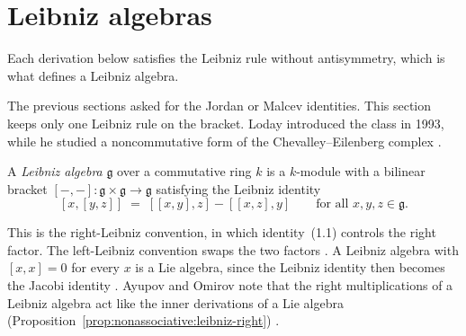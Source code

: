 \section{Leibniz algebras}\label{sec:nonassociative:leibniz}

Each derivation below satisfies the Leibniz rule without antisymmetry, which is what defines a Leibniz algebra.

The previous sections asked for the Jordan or Malcev identities. %
This section keeps only one Leibniz rule on the bracket. Loday introduced
the class in 1993, while he studied a noncommutative form of the
Chevalley--Eilenberg complex \cite[Introduction, p.~139]{LodayPirashvili1993}.

\begin{definition}
\label{def:nonassociative:leibniz}
A \emph{Leibniz algebra} $\mathfrak{g}$ over a commutative ring $k$ is a
$k$-module with a bilinear bracket $[-,-]\colon\mathfrak{g}\times
\mathfrak{g}\to\mathfrak{g}$ satisfying the Leibniz identity
\[
[x,[y,z]]\;=\;[[x,y],z]-[[x,z],y]
\qquad\text{for all }x,y,z\in\mathfrak{g}.
\]
\end{definition}

This is the right-Leibniz convention, in which identity~(1.1) controls the
right factor. The left-Leibniz convention swaps the two factors
\cite[Definition~(1.1), p.~141]{LodayPirashvili1993}. A Leibniz algebra with
$[x,x]=0$ for every $x$ is a Lie algebra, since the Leibniz identity then
becomes the Jacobi identity \cite[Definition~(1.1),
p.~141]{LodayPirashvili1993}. Ayupov and Omirov note that the right
multiplications of a Leibniz algebra act like the inner derivations of a Lie
algebra (Proposition~\ref{prop:nonassociative:leibniz-right}) \cite[p.~2]{AyupovOmirov1998Engel}.

